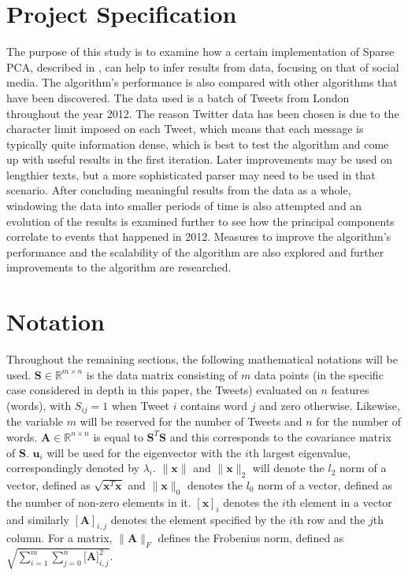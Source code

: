 \documentclass[11pt,a4paper]{article}
\begin{document}

\section{Project Specification}

The purpose of this study is to examine how a certain implementation of Sparse PCA, described in \cite{dimakis}, can help to infer results from data, focusing on that of social media. The algorithm's performance is also compared with other algorithms that have been discovered. The data used is a batch of Tweets from London throughout the year 2012. The reason Twitter data has been chosen is due to the character limit imposed on each Tweet, which means that each message is typically quite information dense, which is best to test the algorithm and come up with useful results in the first iteration. Later improvements may be used on lengthier texts, but a more sophisticated parser may need to be used in that scenario. After concluding meaningful results from the data as a whole, windowing the data into smaller periods of time is also attempted and an evolution of the results is examined further to see how the principal components correlate to events that happened in 2012. Measures to improve the algorithm's performance and the scalability of the algorithm are also explored and further improvements to the algorithm are researched.

\section{Notation}

Throughout the remaining sections, the following mathematical notations will be used. $\mathbf{S} \in  \mathbb{R}^{m\times n}$ is the data matrix consisting of $m$ data points (in the specific case considered in depth in this paper, the Tweets) evaluated on $n$ features (words), with $S_{ij} = 1$ when Tweet $i$ contains word $j$ and zero otherwise. Likewise, the variable $m$ will be reserved for the number of Tweets and $n$ for the number of words. $\mathbf{A} \in \mathbb{R}^{n \times n}$ is equal to $\mathbf{S}^T\mathbf{S}$ and this corresponds to the covariance matrix of $\mathbf{S}$. $\mathbf{u}_i$ will be used for the eigenvector with the $i$th largest eigenvalue, correspondingly denoted by $\lambda_i$. $\|\mathbf{x}\|$ and $\|\mathbf{x}\|_2$ will denote the $l_2$ norm of a vector, defined as $\sqrt{\mathbf{x}^T\mathbf{x}}$ and $\|\mathbf{x}\|_0$ denotes the $l_0$ norm of a vector, defined as the number of non-zero elements in it. $[\mathbf{x} ]_i$ denotes the $i$th element in a vector and similarly $[\mathbf{A}]_{i, j}$ denotes the element specified by the $i$th row and the $j$th column. For a matrix, $\|\mathbf{A}\|_F$ defines the Frobenius norm, defined as $\sqrt{\sum^m_{i=1}{\sum_{j=0}^n{\mathbf{[A}]_{i, j}^2}}}$.
\end{document}
